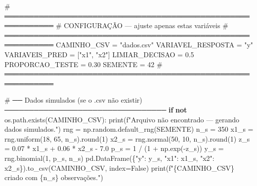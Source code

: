 \documentclass[
  letterpaper,
  DIV=11,
  numbers=noendperiod]{scrartcl}
\newenvironment{Shaded}{\begin{snugshade}}{\end{snugshade}}
\newcommand{\BuiltInTok}[1]{\textcolor[rgb]{0.00,0.23,0.31}{#1}}
\newcommand{\CommentTok}[1]{\textcolor[rgb]{0.37,0.37,0.37}{#1}}
\newcommand{\ControlFlowTok}[1]{\textcolor[rgb]{0.00,0.23,0.31}{\textbf{#1}}}
\newcommand{\DecValTok}[1]{\textcolor[rgb]{0.68,0.00,0.00}{#1}}
\newcommand{\FloatTok}[1]{\textcolor[rgb]{0.68,0.00,0.00}{#1}}
\newcommand{\KeywordTok}[1]{\textcolor[rgb]{0.00,0.23,0.31}{\textbf{#1}}}
\newcommand{\NormalTok}[1]{\textcolor[rgb]{0.00,0.23,0.31}{#1}}
\newcommand{\OperatorTok}[1]{\textcolor[rgb]{0.37,0.37,0.37}{#1}}
\newcommand{\SpecialCharTok}[1]{\textcolor[rgb]{0.37,0.37,0.37}{#1}}
\newcommand{\SpecialStringTok}[1]{\textcolor[rgb]{0.13,0.47,0.30}{#1}}
\newcommand{\StringTok}[1]{\textcolor[rgb]{0.13,0.47,0.30}{#1}}
\newcommand{\VariableTok}[1]{\textcolor[rgb]{0.07,0.07,0.07}{#1}}
\begin{document}
\begin{Shaded}
\begin{Highlighting}[]
\CommentTok{\# ════════════════════════════════════════════════════════════}
\CommentTok{\#  CONFIGURAÇÃO — ajuste apenas estas variáveis}
\CommentTok{\# ════════════════════════════════════════════════════════════}
\NormalTok{CAMINHO\_CSV        }\OperatorTok{=} \StringTok{"dados.csv"}
\NormalTok{VARIAVEL\_RESPOSTA  }\OperatorTok{=} \StringTok{"y"}
\NormalTok{VARIAVEIS\_PRED     }\OperatorTok{=}\NormalTok{ [}\StringTok{"x1"}\NormalTok{, }\StringTok{"x2"}\NormalTok{]}
\NormalTok{LIMIAR\_DECISAO     }\OperatorTok{=} \FloatTok{0.5}
\NormalTok{PROPORCAO\_TESTE    }\OperatorTok{=} \FloatTok{0.30}
\NormalTok{SEMENTE            }\OperatorTok{=} \DecValTok{42}
\CommentTok{\# ════════════════════════════════════════════════════════════}

\CommentTok{\# ── Dados simulados (se o .csv não existir) ─────────────────────────────────}
\ControlFlowTok{if} \KeywordTok{not}\NormalTok{ os.path.exists(CAMINHO\_CSV):}
    \BuiltInTok{print}\NormalTok{(}\SpecialStringTok{f"Arquivo não encontrado — gerando dados simulados."}\NormalTok{)}
\NormalTok{    rng  }\OperatorTok{=}\NormalTok{ np.random.default\_rng(SEMENTE)}
\NormalTok{    n\_s  }\OperatorTok{=} \DecValTok{350}
\NormalTok{    x1\_s }\OperatorTok{=}\NormalTok{ rng.uniform(}\DecValTok{18}\NormalTok{, }\DecValTok{65}\NormalTok{, n\_s).}\BuiltInTok{round}\NormalTok{(}\DecValTok{1}\NormalTok{)}
\NormalTok{    x2\_s }\OperatorTok{=}\NormalTok{ rng.normal(}\DecValTok{50}\NormalTok{, }\DecValTok{10}\NormalTok{, n\_s).}\BuiltInTok{round}\NormalTok{(}\DecValTok{1}\NormalTok{)}
\NormalTok{    z\_s  }\OperatorTok{=} \FloatTok{0.07} \OperatorTok{*}\NormalTok{ x1\_s }\OperatorTok{+} \FloatTok{0.06} \OperatorTok{*}\NormalTok{ x2\_s }\OperatorTok{{-}} \FloatTok{7.0}
\NormalTok{    p\_s  }\OperatorTok{=} \DecValTok{1} \OperatorTok{/}\NormalTok{ (}\DecValTok{1} \OperatorTok{+}\NormalTok{ np.exp(}\OperatorTok{{-}}\NormalTok{z\_s))}
\NormalTok{    y\_s  }\OperatorTok{=}\NormalTok{ rng.binomial(}\DecValTok{1}\NormalTok{, p\_s, n\_s)}
\NormalTok{    pd.DataFrame(\{}\StringTok{"y"}\NormalTok{: y\_s, }\StringTok{"x1"}\NormalTok{: x1\_s, }\StringTok{"x2"}\NormalTok{: x2\_s\}).to\_csv(CAMINHO\_CSV, index}\OperatorTok{=}\VariableTok{False}\NormalTok{)}
    \BuiltInTok{print}\NormalTok{(}\SpecialStringTok{f"\textquotesingle{}}\SpecialCharTok{\{}\NormalTok{CAMINHO\_CSV}\SpecialCharTok{\}}\SpecialStringTok{\textquotesingle{} criado com }\SpecialCharTok{\{}\NormalTok{n\_s}\SpecialCharTok{\}}\SpecialStringTok{ observações."}\NormalTok{)}


\end{Highlighting}
\end{Shaded}
\end{document}
